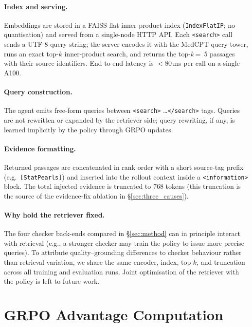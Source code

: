 \documentclass[11pt]{article}
\begin{document}
\paragraph{Index and serving.}
Embeddings are stored in a FAISS flat inner-product
index (\texttt{IndexFlatIP}; no
quantisation) and served from a single-node HTTP API.
Each \texttt{<search>} call sends a UTF-8 query string;
the server encodes it with the MedCPT query tower,
runs an exact top-$k$ inner-product search, and
returns the top-$k$\,=\, 5 passages with their
source identifiers. End-to-end latency is
 $<$80\,ms per call on a single A100.

\paragraph{Query construction.}
The agent emits free-form queries between
\texttt{<search>} \ldots \texttt{</search>} tags.
Queries are not rewritten or expanded by the retriever
side; query rewriting, if any, is learned implicitly
by the policy through GRPO updates.

\paragraph{Evidence formatting.}
Returned passages are concatenated in rank order with a
short source-tag prefix (e.g.\ \texttt{[StatPearls]})
and inserted into the rollout context inside a
\texttt{<information>} block. The total injected
evidence is truncated to 768 tokens (this truncation is
the source of the evidence-fix ablation in
\S\ref{sec:three_causes}).

\paragraph{Why hold the retriever fixed.}
The four checker back-ends compared in
\S\ref{sec:method} can in principle interact with
retrieval (e.g., a stronger checker may train the
policy to issue more precise queries). To attribute
quality--grounding differences to checker behaviour
rather than retrieval variation, we share the same
encoder, index, top-$k$, and truncation across all
training and evaluation runs. Joint optimisation of
the retriever with the policy is left to future
work.


\section{GRPO Advantage Computation}
\label{app:grpo}
\end{document}
